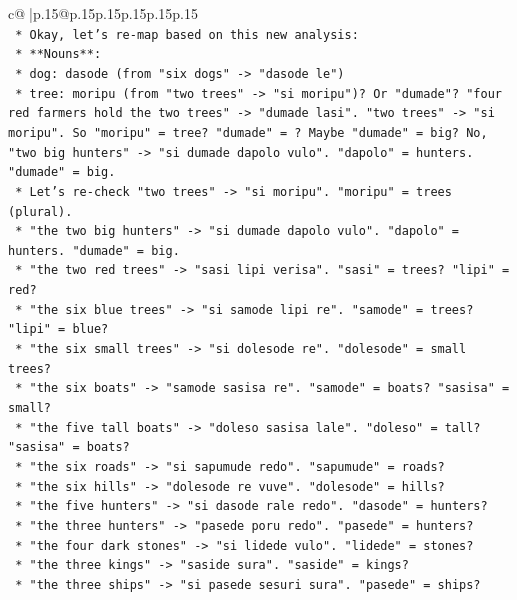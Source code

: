 \documentclass{article}
\begin{document}
{\begin{supertabular}{c@{$\;$}|p{.15\linewidth}@{}p{.15\linewidth}p{.15\linewidth}p{.15\linewidth}p{.15\linewidth}p{.15\linewidth}}
{{{\\ 
\texttt{    *   Okay, let's re{-}map based on this new analysis:} \\
\texttt{        *   **Nouns**:} \\
\texttt{            *   dog: dasode (from "six dogs" {-}> "dasode le")} \\
\texttt{            *   tree: moripu (from "two trees" {-}> "si moripu")? Or "dumade"? "four red farmers hold the two trees" {-}> "dumade lasi". "two trees" {-}> "si moripu". So "moripu" = tree? "dumade" = ? Maybe "dumade" = big? No, "two big hunters" {-}> "si dumade dapolo vulo". "dapolo" = hunters. "dumade" = big.} \\
\texttt{            *   Let's re{-}check "two trees" {-}> "si moripu". "moripu" = trees (plural).} \\
\texttt{            *   "the two big hunters" {-}> "si dumade dapolo vulo". "dapolo" = hunters. "dumade" = big.} \\
\texttt{            *   "the two red trees" {-}> "sasi lipi verisa". "sasi" = trees? "lipi" = red?} \\
\texttt{            *   "the six blue trees" {-}> "si samode lipi re". "samode" = trees? "lipi" = blue?} \\
\texttt{            *   "the six small trees" {-}> "si dolesode re". "dolesode" = small trees?} \\
\texttt{            *   "the six boats" {-}> "samode sasisa re". "samode" = boats? "sasisa" = small?} \\
\texttt{            *   "the five tall boats" {-}> "doleso sasisa lale". "doleso" = tall? "sasisa" = boats?} \\
\texttt{            *   "the six roads" {-}> "si sapumude redo". "sapumude" = roads?} \\
\texttt{            *   "the six hills" {-}> "dolesode re vuve". "dolesode" = hills?} \\
\texttt{            *   "the five hunters" {-}> "si dasode rale redo". "dasode" = hunters?} \\
\texttt{            *   "the three hunters" {-}> "pasede poru redo". "pasede" = hunters?} \\
\texttt{            *   "the four dark stones" {-}> "si lidede vulo". "lidede" = stones?} \\
\texttt{            *   "the three kings" {-}> "saside sura". "saside" = kings?} \\
\texttt{            *   "the three ships" {-}> "si pasede sesuri sura". "pasede" = ships?} \\
}}}
\end{supertabular}}
\end{document}

